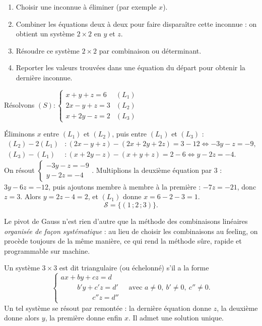 \documentclass[11pt]{article}
\newcommand{\cle}[1]{{\popxbold\color{popdark}#1}}
\newcounter{popsec}
\newcounter{popsub}
\newcommand{\courssub}[1]{%
  \stepcounter{popsub}%
  \par\vspace{9pt}\noindent{\popxbold\fontsize{11.5}{13}\selectfont\color{popink}{\color{poporange}\thepopsec.\thepopsub}\hspace{6pt}#1}\par\nopagebreak\vspace{4pt}
}
\begin{document}
\begin{methode}
\begin{enumerate}
\item Choisir une inconnue à éliminer (par exemple $x$).
\item Combiner les équations deux à deux pour faire disparaître cette inconnue : on obtient un système $2\times 2$ en $y$ et $z$.
\item Résoudre ce système $2\times 2$ par combinaison ou déterminant.
\item Reporter les valeurs trouvées dans une équation du départ pour obtenir la dernière inconnue.
\end{enumerate}
\end{methode}

\begin{exemplebox}
Résolvons $(S) : \begin{cases} x + y + z = 6 & (L_1)\\ 2x - y + z = 3 & (L_2)\\ x + 2y - z = 2 & (L_3) \end{cases}$

Éliminons $x$ entre $(L_1)$ et $(L_2)$, puis entre $(L_1)$ et $(L_3)$ :
\begin{align*}
(L_2) - 2(L_1) &: (2x-y+z) - (2x+2y+2z) = 3 - 12 \iff -3y - z = -9,\\
(L_3) - (L_1) &: (x+2y-z) - (x+y+z) = 2 - 6 \iff y - 2z = -4.
\end{align*}
On résout $\begin{cases} -3y - z = -9 \\ y - 2z = -4 \end{cases}$. Multiplions la deuxième équation par $3$ : $3y - 6z = -12$, puis ajoutons membre à membre à la première : $-7z = -21$, donc $z = 3$. Alors $y = 2z - 4 = 2$, et $(L_1)$ donne $x = 6 - 2 - 3 = 1$.
\[
\mathcal{S} = \{(1\,;2\,;3)\}.
\]
\end{exemplebox}

\courssub{La méthode du pivot de Gauss}

Le pivot de Gauss n'est rien d'autre que la méthode des combinaisons linéaires \emph{organisée de façon systématique} : au lieu de choisir les combinaisons au feeling, on procède toujours de la même manière, ce qui rend la méthode sûre, rapide et programmable sur machine.

\begin{definition}
Un système $3\times 3$ est dit \cle{triangulaire} (ou \cle{échelonné}) s'il a la forme
\[
\begin{cases} ax + by + cz = d \\ \phantom{ax +{}} b'y + c'z = d' \\ \phantom{ax + by +{}} c''z = d'' \end{cases} \quad \text{avec } a \neq 0,\ b' \neq 0,\ c'' \neq 0.
\]
Un tel système se résout par \cle{remontée} : la dernière équation donne $z$, la deuxième donne alors $y$, la première donne enfin $x$. Il admet une solution unique.
\end{definition}
\end{document}
